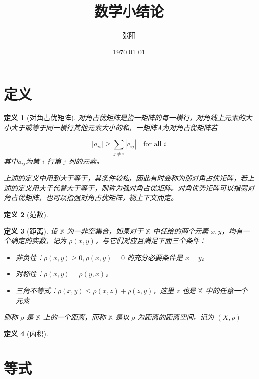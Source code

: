 \documentclass{ctexart}
\title{数学小结论}
\date{\today}
\author{张阳}
\numberwithin{equation}{section}    %
\newtheorem{definition}{定义}
\begin{document}
\maketitle
\tableofcontents
\newpage
\section{定义}
\begin{definition}[对角占优矩阵]
    对角占优矩阵是指一矩阵的每一横行，对角线上元素的大小大于或等于同一横行其他元素大小的和，一矩阵A为对角占优矩阵若

\begin{equation}
|a_{ii}|\geq \sum _{j\neq i}|a_{ij}|\quad {\text{for all }}i
\end{equation}
其中$a_{ij}$为第 $i$ 行第 $j$ 列的元素。

上述的定义中用到大于等于，其条件较松，因此有时会称为弱对角占优矩阵，若上述的定义用大于代替大于等于，则称为强对角占优矩阵。对角优势矩阵可以指弱对角占优矩阵，也可以指强对角占优矩阵，视上下文而定。
\end{definition}

\begin{definition}[范数]
    
\end{definition}
\begin{definition}[距离]
    设 $\mathbb{X}$ 为一非空集合，如果对于 $\mathbb{X}$ 中任给的两个元素 $x,y$，均有一个确定的实数，记为 $\rho(x,y)$，与它们对应且满足下面三个条件：
    \begin{itemize}
        \item 非负性：$\rho(x,y)\geqslant0,\rho(x,y)=0$ 的充分必要条件是 $x=y$。
        \item 对称性：$\rho(x,y)=\rho(y,x)$。
        \item 三角不等式：$\rho(x,y)\leqslant\rho(x,z)+\rho(z,y)$，这里 $z$ 也是 $\mathbb{X}$ 中的任意一个元素
    \end{itemize}
    则称 $\rho$ 是 $\mathbb{X}$ 上的一个距离，而称 $\mathbb{X}$ 是以 $\rho$ 为距离的距离空间，记为 $(X,\rho)$
\end{definition}

\begin{definition}[内积]
    
\end{definition}
\section{等式}
\end{document}
